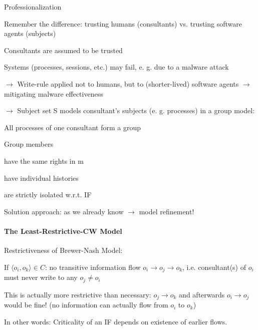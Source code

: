 \documentclass[a4paper]{article}
\begin{document}
\begin{multicols}{3}
    Professionalization
    \begin{itemize*}
        \item Remember the difference: trusting humans (consultants) vs. trusting software agents (subjects)
              \begin{itemize*}
                  \item Consultants are assumed to be trusted
                  \item Systems (processes, sessions, etc.) may fail, e. g. due to a malware attack
              \end{itemize*}
        \item $\rightarrow$ Write-rule applied not to humans, but to (shorter-lived) software agents $\rightarrow$ mitigating malware effectiveness
        \item $\rightarrow$ Subject set S models consultant’s subjects (e. g. processes) in a group model:
              \begin{itemize*}
                  \item All processes of one consultant form a group
                  \item Group members
                        \begin{itemize*}
                            \item have the same rights in m
                            \item have individual histories
                            \item are strictly isolated w.r.t. IF
                        \end{itemize*}
              \end{itemize*}
        \item Solution approach: as we already know $\rightarrow$ model refinement!
    \end{itemize*}


    \paragraph{The Least-Restrictive-CW Model}
    Restrictiveness of Brewer-Nash Model:
    \begin{itemize*}
        \item If $⟨o_i,o_k⟩\in C$: no transitive information flow $o_i \rightarrow o_j\rightarrow o_k$, i.e. consultant(s) of $o_i$ must never write to any $o_j\not=o_i$
        \item This is actually more restrictive than necessary: $o_j\rightarrow o_k$ and afterwards $o_i\rightarrow o_j$ would be fine! (no information can actually flow from $o_i$ to $o_k$)
        \item In other words: Criticality of an IF depends on existence of earlier flows.
    \end{itemize*}


\end{multicols}
\end{document}
